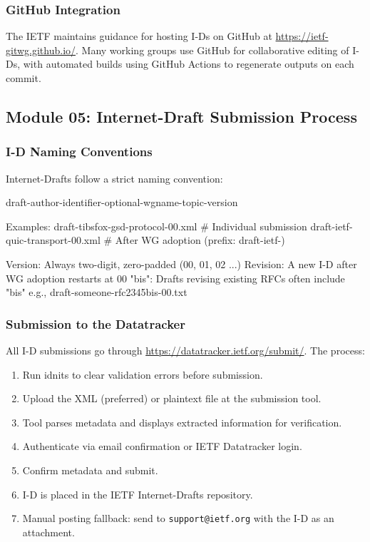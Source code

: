 \documentclass[11pt,letterpaper]{article}
\begin{document}
\subsubsection{GitHub Integration}

The IETF maintains guidance for hosting I-Ds on GitHub at \url{https://ietf-gitwg.github.io/}. Many working groups use GitHub for collaborative editing of I-Ds, with automated builds using GitHub Actions to regenerate outputs on each commit.

\subsection{Module 05: Internet-Draft Submission Process}

\subsubsection{I-D Naming Conventions}

Internet-Drafts follow a strict naming convention:

\begin{codebox}
draft-{author-identifier}-{optional-wgname}-{topic}-{version}

Examples:
  draft-tibsfox-gsd-protocol-00.xml    # Individual submission
  draft-ietf-quic-transport-00.xml     # After WG adoption (prefix: draft-ietf-)

Version:  Always two-digit, zero-padded (00, 01, 02 ...)
Revision: A new I-D after WG adoption restarts at 00
"bis":    Drafts revising existing RFCs often include "bis"
          e.g., draft-someone-rfc2345bis-00.txt
\end{codebox}

\subsubsection{Submission to the Datatracker}

All I-D submissions go through \url{https://datatracker.ietf.org/submit/}. The process:

\begin{enumerate}
  \item Run idnits to clear validation errors before submission.
  \item Upload the XML (preferred) or plaintext file at the submission tool.
  \item Tool parses metadata and displays extracted information for verification.
  \item Authenticate via email confirmation or IETF Datatracker login.
  \item Confirm metadata and submit.
  \item I-D is placed in the IETF Internet-Drafts repository.
  \item Manual posting fallback: send to \texttt{support@ietf.org} with the I-D as an attachment.
\end{enumerate}
\end{document}
